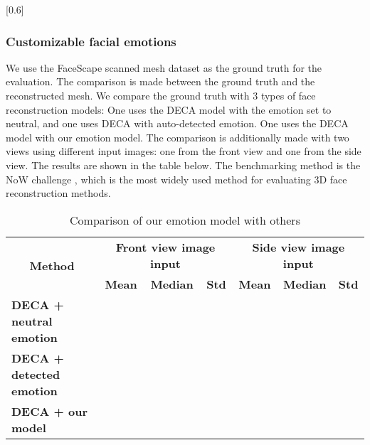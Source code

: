 [0.6]

\subsubsection{Customizable facial emotions}

We use the FaceScape scanned mesh dataset as the ground truth for the evaluation. The comparison is made between the ground truth and the reconstructed mesh. We compare the ground truth with 3 types of face reconstruction models: One uses the DECA model with the emotion set to neutral, and one uses DECA with auto-detected emotion. One uses the DECA model with our emotion model. The comparison is additionally made with two views using different input images: one from the front view and one from the side view. The results are shown in the table below. The benchmarking method is the NoW challenge \cite{RingNet:CVPR:2019}, which is the most widely used method for evaluating 3D face reconstruction methods.

\begin{table}[H]
    \centering
    \captionsetup{font=bf}
    \caption{Comparison of our emotion model with others}
    \begin{tabular}{|l|ccc|ccc|}
        \hline
        \multicolumn{1}{|c|}{\multirow{2}{*}{\textbf{Method}}} & \multicolumn{3}{c|}{\textbf{Front view image input}} & \multicolumn{3}{c|}{\textbf{Side view image input}}                                                                                                           \\ \cline{2-7}
        \multicolumn{1}{|c|}{}                                 & \multicolumn{1}{c|}{\textbf{Mean}}                   & \multicolumn{1}{c|}{\textbf{Median}}                & \textbf{Std} & \multicolumn{1}{c|}{\textbf{Mean}} & \multicolumn{1}{c|}{\textbf{Median}} & \textbf{Std} \\ \hline
        \textbf{DECA + neutral emotion}                        & \multicolumn{1}{c|}{}                                & \multicolumn{1}{c|}{}                               &              & \multicolumn{1}{c|}{}              & \multicolumn{1}{c|}{}                &              \\ \hline
        \textbf{DECA + detected emotion}                       & \multicolumn{1}{c|}{}                                & \multicolumn{1}{c|}{}                               &              & \multicolumn{1}{c|}{}              & \multicolumn{1}{c|}{}                &              \\ \hline
        \textbf{DECA + our model}                              & \multicolumn{1}{c|}{}                                & \multicolumn{1}{c|}{}                               &              & \multicolumn{1}{c|}{}              & \multicolumn{1}{c|}{}                &              \\ \hline
    \end{tabular}
    \label{now_results}
\end{table}
